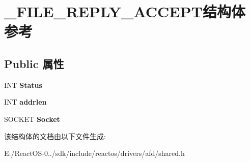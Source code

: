 \hypertarget{struct___f_i_l_e___r_e_p_l_y___a_c_c_e_p_t}{}\section{\+\_\+\+F\+I\+L\+E\+\_\+\+R\+E\+P\+L\+Y\+\_\+\+A\+C\+C\+E\+P\+T结构体 参考}
\label{struct___f_i_l_e___r_e_p_l_y___a_c_c_e_p_t}
\subsection*{Public 属性}
\begin{DoxyCompactItemize}
\item 
\mbox{\label{struct___f_i_l_e___r_e_p_l_y___a_c_c_e_p_t_afaaaa354c91541c72b703e98c1a37ed3}} 
I\+NT {\bfseries Status}
\item 
\mbox{\label{struct___f_i_l_e___r_e_p_l_y___a_c_c_e_p_t_a6f337b5f6627c8e1780368904756b598}} 
I\+NT {\bfseries addrlen}
\item 
\mbox{\label{struct___f_i_l_e___r_e_p_l_y___a_c_c_e_p_t_a3a1624fc51b9cae3d335ba0aadccb7a1}} 
S\+O\+C\+K\+ET {\bfseries Socket}
\end{DoxyCompactItemize}


该结构体的文档由以下文件生成\+:\begin{DoxyCompactItemize}
\item 
E\+:/\+React\+O\+S-\/0../sdk/include/reactos/drivers/afd/shared.\+h\end{DoxyCompactItemize}
